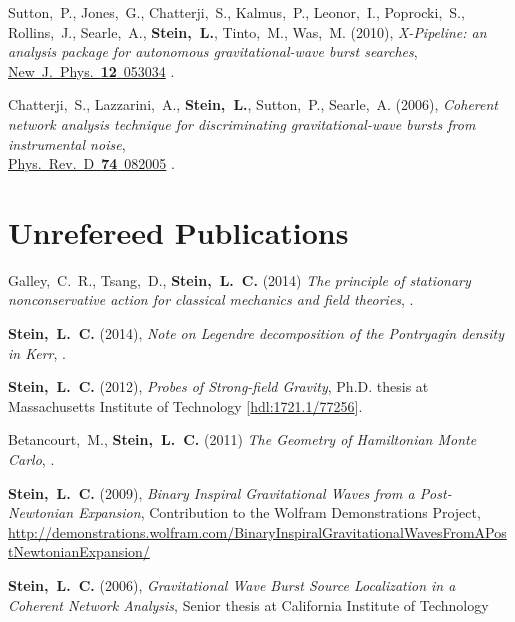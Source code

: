 \begin{etaremune}[start=\value{pubCounter}]
  Sutton,~P., Jones,~G., Chatterji,~S., Kalmus,~P., Leonor,~I.,
  Poprocki,~S., Rollins,~J., Searle,~A., {\bf Stein,~L.}, Tinto,~M.,
  Was,~M.
  (2010),
  {\it X-Pipeline: an analysis package for autonomous
    gravitational-wave burst searches},
  \href{http://dx.doi.org/10.1088/1367-2630/12/5/053034}{New~J.~Phys.~{\bf 12}~053034}
  .
\item
  Chatterji,~S., Lazzarini,~A., {\bf Stein,~L.}, Sutton,~P.,
  Searle,~A.
  (2006),
  {\it Coherent network analysis technique for
    discriminating gravitational-wave bursts from instrumental noise},\\
  \href{http://dx.doi.org/10.1103/PhysRevD.74.082005}{Phys.~Rev.~D~{\bf 74}~082005}
  .
  \setcounter{pubCounter}{\value{enumi}}
\end{etaremune}

\section{\sc Unrefereed Publications}
\addtocounter{pubCounter}{-1}
\begin{etaremune}[start=\value{pubCounter}]
\item
  Galley,~C.~R., Tsang,~D., {\bf Stein,~L.~C.}
  (2014)
  {\it The principle of stationary nonconservative action for
    classical mechanics and field theories},
  .
\item
  {\bf Stein,~L.~C.}
  (2014),
  {\it Note on Legendre decomposition of the Pontryagin density in Kerr},
  .
\item
  {\bf Stein,~L.~C.}
  (2012),
  {\it Probes of Strong-field Gravity}, Ph.D. thesis at Massachusetts
  Institute of Technology
  [\href{http://hdl.handle.net/1721.1/77256}{hdl:1721.1/77256}].
\item
  Betancourt,~M., {\bf Stein,~L.~C.}
  (2011)
  {\it The Geometry of Hamiltonian Monte Carlo},
  .
\item
  {\bf Stein,~L.~C.}
  (2009),
  {\it Binary Inspiral Gravitational Waves from a Post-Newtonian Expansion},
  Contribution to the Wolfram Demonstrations Project,
  \url{http://demonstrations.wolfram.com/BinaryInspiralGravitationalWavesFromAPostNewtonianExpansion/}
\item
  {\bf Stein,~L.~C.}
  (2006),
  {\it Gravitational Wave Burst Source Localization in a Coherent
    Network Analysis},
  Senior thesis at California Institute of Technology
\end{etaremune}


